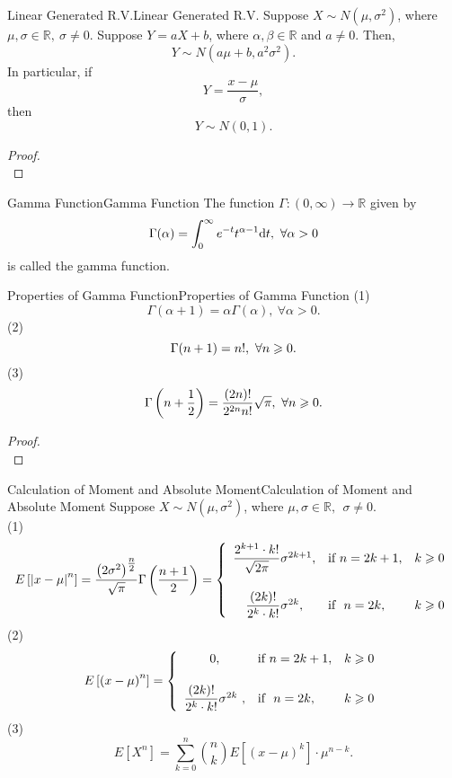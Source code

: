 \documentclass{elegantbook}
\begin{document}
\begin{theorem}{Linear Generated R.V.}{Linear Generated R.V.}
Suppose $X\sim N(\mu,\sigma^2)$, where $\mu,\sigma\in\mathbb{R},\ \sigma\neq0$. Suppose $Y=aX+b$, where $\alpha,\beta\in\mathbb{R}$ and $a\neq0$. Then,
$$
Y\sim N\left(a\mu+b,a^2\sigma^2\right).
$$
In particular, if
$$
Y=\frac{x-\mu}{\sigma},
$$
then
$$
Y\sim N(0,1).
$$
\end{theorem}

\begin{proof}
\\[4cm]\vspace{0.01cm}
\end{proof}

\begin{definition}{Gamma Function}{Gamma Function}
The function $\Gamma:(0,\infty)\rightarrow\mathbb{R}$ given by
$$
{\Gamma}(\alpha)=\int_{0}^{\infty}e^{-t}t^{\alpha-1}\dif t,\ \forall\alpha>0
$$
is called the gamma function.
\end{definition}

\begin{theorem}{Properties of Gamma Function}{Properties of Gamma Function}
(1)
$$
{\Gamma}(\alpha+1)=\alpha\Gamma(\alpha),\ \forall\alpha>0.
$$
(2)
$$
{\Gamma}(n+1)=n!,\ \forall n\geqslant0.
$$
(3)
$$
{\Gamma}\left(n+\frac{1}{2}\right)=\frac{\left(2n\right)!}{2^{2n}n!}\sqrt\pi,\ \forall n\gs0.
$$
\end{theorem}

\begin{proof}
\\[4cm]\vspace{0.01cm}
\end{proof}

\begin{theorem}{Calculation of Moment and Absolute Moment}{Calculation of Moment and Absolute Moment}
Suppose $X\sim N(\mu,\sigma^2)$, where $\mu,\sigma\in\mathbb{R},\ \ \sigma\neq0$.\\
(1)
\[E\left\lbrack \left| x - \mu \right|^{n} \right\rbrack = \frac{\left( 2\sigma^{2} \right)^{\tfrac{n}{2}}}{\sqrt{\pi}}\Gamma\left( \frac{n + 1}{2} \right) = \left\{ \begin{array}{cll}
\dfrac{2^{k + 1} \cdot k!}{\sqrt{2\pi}}\sigma^{2k + 1},&\mathrm{\text{if}}\ n = 2k + 1,&k \gs 0 \vspace{0.5cm}\\
\dfrac{(2k)!}{2^{k} \cdot k!}\sigma^{2k},&\text{if}\ \ n = 2k,&k \gs 0 \\
\end{array} \right.\]
(2)
\[E\left\lbrack {(x - \mu)}^{n} \right\rbrack = \left\{ \begin{array}{cll}
0,&\mathrm{\text{if}}\ n = 2k + 1,&k \gs 0 \vspace{0.5cm}\\
\dfrac{(2k)!}{2^{k} \cdot k!}\sigma^{2k}\ ,&{\text{if}}\ \ n = 2k,&k \gs 0 \\
\end{array} \right.\]
(3)
\[E[X^{n}] = \sum_{k = 0}^{n}\binom n k E\left\lbrack \left( x - \mu \right)^{k} \right\rbrack\cdot \mu^{n - k}.\]
\end{theorem}
\end{document}
